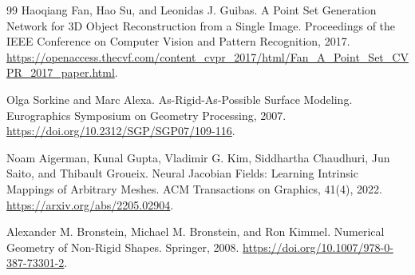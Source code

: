 \documentclass{article}
\begin{document}
\begin{thebibliography}{99}
Haoqiang Fan, Hao Su, and Leonidas J. Guibas.
\newblock A Point Set Generation Network for 3D Object Reconstruction from a
Single Image.
\newblock Proceedings of the IEEE Conference on Computer Vision and Pattern
Recognition, 2017.
\newblock \url{https://openaccess.thecvf.com/content_cvpr_2017/html/Fan_A_Point_Set_CVPR_2017_paper.html}.

Olga Sorkine and Marc Alexa.
\newblock As-Rigid-As-Possible Surface Modeling.
\newblock Eurographics Symposium on Geometry Processing, 2007.
\newblock \url{https://doi.org/10.2312/SGP/SGP07/109-116}.

Noam Aigerman, Kunal Gupta, Vladimir G. Kim, Siddhartha Chaudhuri, Jun Saito,
and Thibault Groueix.
\newblock Neural Jacobian Fields: Learning Intrinsic Mappings of Arbitrary
Meshes.
\newblock ACM Transactions on Graphics, 41(4), 2022.
\newblock \url{https://arxiv.org/abs/2205.02904}.

Alexander M. Bronstein, Michael M. Bronstein, and Ron Kimmel.
\newblock Numerical Geometry of Non-Rigid Shapes.
\newblock Springer, 2008.
\newblock \url{https://doi.org/10.1007/978-0-387-73301-2}.

\end{thebibliography}
\endgroup
\end{document}
